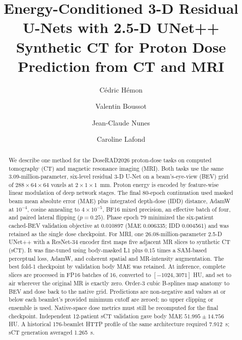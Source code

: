 \documentclass[runningheads]{llncs}
\begin{document}
\title{Energy-Conditioned 3-D Residual U-Nets with 2.5-D UNet++ Synthetic CT for Proton Dose Prediction from CT and MRI}

\author{C\'edric H\'emon \and Valentin Boussot \and
Jean-Claude Nunes \and Caroline Lafond}

\maketitle

\begin{abstract}
We describe one method for the DoseRAD2026 proton-dose tasks on computed
tomography (CT) and magnetic resonance imaging (MRI). Both tasks use the same
3.09-million-parameter, six-level residual 3-D U-Net on a beam's-eye-view
(BEV) grid of $288\times64\times64$ voxels at $2\times1\times1$~mm. Proton
energy is encoded by feature-wise linear modulation of deep network stages.
The final 80-epoch continuation used masked beam mean absolute error (MAE) plus
integrated depth-dose (IDD) distance, AdamW at $10^{-4}$, cosine annealing to
$4\times10^{-5}$, BF16 mixed precision, an effective batch of four, and paired
lateral flipping ($p=0.25$). Phase epoch 79 minimized the six-patient cached-BEV
validation objective at 0.010897 (MAE 0.006335; IDD 0.004561) and was retained
as the single dose checkpoint.
For MRI, one 26.08-million-parameter 2.5-D UNet++ with a ResNet-34 encoder first
maps five adjacent MR slices to synthetic CT (sCT). It was fine-tuned using
body-masked L1 plus $0.15$ times a SAM-based perceptual loss, AdamW, and
coherent spatial and MR-intensity augmentation. The best fold-1 checkpoint by
validation body MAE was retained. At inference, complete slices are processed
in FP16 batches of 16, converted to $[-1024,3071]$ HU, and set to air wherever
the original MR is exactly zero.
Order-3 cubic B-splines map anatomy to BEV and dose back to the native grid.
Predictions are non-negative and values at or below each beamlet's provided
minimum cutoff are zeroed; no upper clipping or ensemble is used. Native-space
dose metrics must still be recomputed for the final checkpoint. Independent
12-patient sCT validation gave body MAE
$51.995\pm14.756$ HU. A historical 176-beamlet HTTP profile of the same
architecture required 7.912~s; sCT generation averaged 1.265~s.

\end{abstract}
\end{document}
